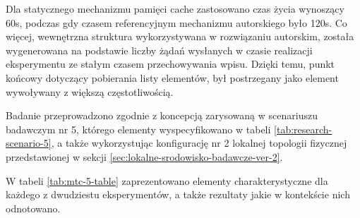 Dla statycznego mechanizmu pamięci cache zastosowano czas życia wynoszący 60s, podczas gdy czasem referencyjnym mechanizmu autorskiego było 120s. Co więcej, wewnętrzna struktura wykorzystywana w rozwiązaniu autorskim, została wygenerowana na podstawie liczby żądań wysłanych w czasie realizacji eksperymentu ze stałym czasem przechowywania wpisu. Dzięki temu, punkt końcowy dotyczący pobierania listy elementów, był postrzegany jako element wywoływany z większą częstotliwością.

Badanie przeprowadzono zgodnie z koncepcją zarysowaną w scenariuszu badawczym nr 5, którego elementy wyspecyfikowano w tabeli \ref{tab:research-scenario-5}, a także wykorzystując konfigurację nr 2 lokalnej topologii fizycznej przedstawionej w sekcji \ref{sec:lokalne-srodowisko-badawcze-ver-2}.

W tabeli \ref{tab:mtc-5-table} zaprezentowano elementy charakterystyczne dla każdego z dwudziestu eksperymentów, a także rezultaty jakie w kontekście nich odnotowano.


